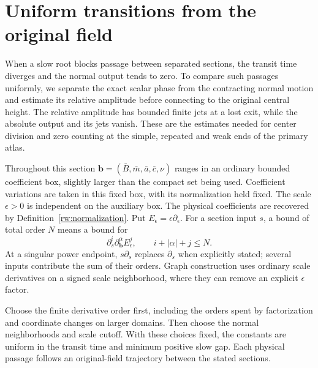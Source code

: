\section{Uniform transitions from the original field}\label{rw:transitions}

When a slow root blocks passage between separated sections, the transit
time diverges and the normal output tends to zero.  To compare such passages uniformly, we
separate the exact scalar phase from the contracting normal motion and
estimate its relative amplitude before connecting to the original
central height.  The relative amplitude has bounded finite jets at a
lost exit, while the absolute output and its jets vanish.  These are
the estimates needed for center division and zero counting at the
simple, repeated and weak ends of the primary atlas.

Throughout this section $\mathbf b=(\bar B,\bar m,\bar a,\bar c,\nu)$
ranges in an ordinary bounded coefficient box, slightly larger than the
compact set being used. Coefficient variations are taken in this fixed
box, with its normalization held fixed. The scale $\epsilon>0$ is
independent on the auxiliary box.
The physical coefficients are recovered by Definition~\ref{rw:normalization}.
Put $E_\epsilon=\epsilon\partial_\epsilon$. For a section input $s$,
a bound of total order $N$ means a bound for
\[
 \partial_s^i\partial_{\mathbf b}^{\alpha}E_\epsilon^j,
 \qquad i+|\alpha|+j\le N.
\]
At a singular power endpoint, $s\partial_s$ replaces $\partial_s$
when explicitly stated; several inputs contribute the sum of their
orders. Graph construction uses ordinary scale derivatives on a signed
scale neighborhood, where they can remove an explicit $\epsilon$ factor.

Choose the finite derivative order first, including the orders spent
by factorization and coordinate changes on larger domains.  Then
choose the normal neighborhoods and scale cutoff.  With these choices
fixed, the constants are uniform in the transit time and minimum
positive slow gap.  Each physical passage follows an original-field
trajectory between the stated sections.








